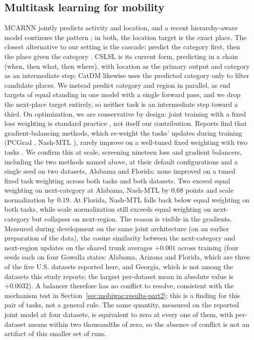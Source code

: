 \subsection{Multitask learning for mobility}
\label{sec:mobiwac:related-mtl}
MCARNN \cite{Liao2018} jointly predicts activity and
location, and a recent hierarchy-aware model continues the
pattern \cite{wang2025hamtl}; in both, the location target is
the exact place. The closest alternative to our setting is
the cascade: predict the category first, then the place given the
category \cite{ye2013nextmove}. CSLSL
\cite{huang2024cslsl} is its current form, predicting in a chain (when, then what,
then where), with location as the primary output and category as an
intermediate step; CatDM \cite{yu2020catdm} likewise uses the predicted
category only to filter candidate places. We instead predict
category and region in parallel, as end targets of equal standing in one model
with a single forward pass, and we drop the next-place target entirely, so
neither task is an intermediate step toward a third. On optimization, we are conservative by design: joint
training with a fixed loss weighting is standard practice
\cite{caruana1997multitask}, not itself our contribution.
Reports find that gradient-balancing methods, which re-weight
the tasks' updates during training (PCGrad \cite{yu2020pcgrad}, Nash-MTL \cite{nash}), rarely improve on a
well-tuned fixed weighting with two tasks \cite{xin2022domtl}.
We confirm this at scale, screening nineteen loss and gradient balancers, including
the two methods named above, at their default configurations and a single seed on two
datasets, Alabama and Florida: none improved on a tuned fixed task weighting across both
tasks and both datasets. Two exceed equal weighting on next-category at Alabama,
Nash-MTL by $0.68$ points and scale normalization by $0.19$. At Florida, Nash-MTL falls
back below equal weighting on both tasks, while scale normalization still exceeds equal
weighting on next-category but collapses on next-region.
The reason is visible in the gradients. Measured during development on the same
joint architecture (on an earlier preparation of the data), the cosine
similarity between the next-category and next-region updates on the shared
trunk averages $+0.001$ across training (four seeds each on four Gowalla
states: Alabama, Arizona and Florida, which are three of the five U.S. datasets reported
here, and Georgia, which is not among the datasets this study reports; the largest per-dataset mean in
absolute value is $+0.0032$). A balancer therefore has no
conflict to resolve, consistent with the mechanism test in
Section~\ref{sec:mobiwac:results-part2}; this is a finding for this pair of tasks, not a
general rule. The same quantity, measured on the reported joint model at four datasets, is equivalent to zero at
every one of them, with per-dataset means within two thousandths of zero, so the absence of
conflict is not an artifact of this smaller set of runs.


